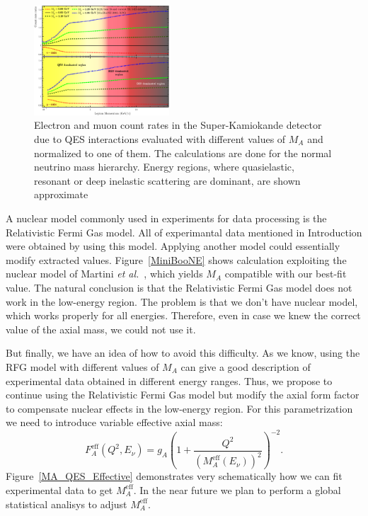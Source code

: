 \documentclass[preprint]{elsarticle}
\begin{document}
\begin{figure}[h!]
\begin{center}
\includegraphics[width=0.45\textwidth]{./SK/Count_rate_ratio.eps}
\caption{\label{CountRate}Electron and muon count rates in the Super-Kamiokande detector due to QES interactions evaluated with different values of $M_A$ and normalized to one of them. The calculations are done for the normal neutrino mass hierarchy. Energy regions, where quasielastic, resonant or deep inelastic scattering are dominant, are shown approximate}
\end{center}
\end{figure}

A nuclear model commonly used in experiments for data processing is the Relativistic Fermi Gas model. All of experimantal data mentioned in Introduction were obtained by using this model. Applying another model could essentially modify extracted values. Figure~\ref{MiniBooNE} shows calculation exploiting the nuclear model of Martini \textit{et al.}~\cite{Martini:2011wp}, which yields $M_A$ compatible with our best-fit value. The natural conclusion is that the Relativistic Fermi Gas model does not work in the low-energy region. The problem is that we don't have nuclear model, which works properly for all energies. Therefore, even in case we knew the correct value of the axial mass, we could not use it.

But finally, we have an idea of how to avoid this difficulty. As we know, using the RFG model with different values of $M_A$ can give a good description of experimental data obtained in different energy ranges. Thus, we propose to continue using the Relativistic Fermi Gas model but modify the axial form factor to compensate nuclear effects in the low-energy region. For this parametrization we need to introduce variable effective axial mass:
\begin{equation}
F_{A}^{\mathrm{eff}}(Q^{2},E_{\nu})=g_{A}\left(1+\frac{Q^{2}}{(M_{A}^{\mathrm{eff}}(E_{\nu}))^{2}}\right)^{-2}.
\end{equation}
Figure~\ref{MA_QES_Effective} demonstrates very schematically how we can fit experimental data to get $M_{A}^{\mathrm{eff}}$. In the near future we plan to perform a global statistical analisys to adjust $M_{A}^{\mathrm{eff}}$.
\end{document}
